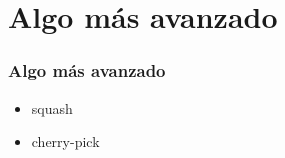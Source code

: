 \section{Algo más avanzado}
\frame
{
\frametitle{Algo más avanzado}
\begin{itemize}
 \item squash
 \item cherry-pick
\end{itemize}
}
